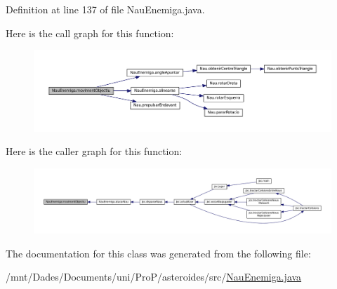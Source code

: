 Definition at line 137 of file Nau\+Enemiga.\+java.



Here is the call graph for this function\+:\nopagebreak
\begin{figure}[H]
\begin{center}
\leavevmode
\includegraphics[width=350pt]{class_nau_enemiga_a293dc01f263e42b1b0125e30bf634a18_cgraph}
\end{center}
\end{figure}




Here is the caller graph for this function\+:
\nopagebreak
\begin{figure}[H]
\begin{center}
\leavevmode
\includegraphics[width=350pt]{class_nau_enemiga_a293dc01f263e42b1b0125e30bf634a18_icgraph}
\end{center}
\end{figure}




The documentation for this class was generated from the following file\+:\begin{DoxyCompactItemize}
\item 
/mnt/\+Dades/\+Documents/uni/\+Pro\+P/asteroides/src/\hyperlink{_nau_enemiga_8java}{Nau\+Enemiga.\+java}\end{DoxyCompactItemize}
